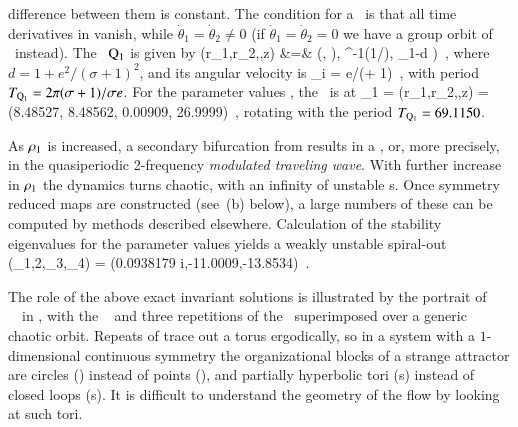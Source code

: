 \documentclass[preprint,number,sort&compress]{elsarticle}
\begin{document}
difference between them is constant.
The condition for a \reqv\ is that all
time derivatives in  vanish, while
$\dot{\theta}_1=\dot{\theta}_2\neq 0$ (if
$\dot{\theta}_1=\dot{\theta}_2=0$ we have a group orbit
of \eqva\ instead).
The \reqv\
$\mathrm{Q}_{1}$ is given by
\bea
(r_1,r_2,\theta,z) &=&
\left(,  ),
     \cos^{-1}({1}/{}),  \rho_1-d
\right)
\,,
\label{eq:E1-PC}
\eea
where $d=1 + {e^2}/{(\sigma +1)^2}$, and
its angular velocity is
\beq
\dot{\theta}_{i}
= {\sigma e}/{(\sigma + 1)}
\,,
\label{eq:REQV1veloc}
\eeq
with period
${T_{{\mathrm{Q}_{1}}}}= 2\pi (\sigma + 1)/\sigma e$.
For the parameter values , the \reqv\ is at
\beq
\ssp_{\REQV{}1} = (r_1,r_2,\theta,z) =
     (8.48527,
      8.48562,
      0.00909,
      26.9999)
\,,
\label{eq:Q1}
\eeq
rotating with the period ${T_{{\mathrm{Q}_{1}}}}=69.1150$.

As $\rho_1$ is increased,  a secondary bifurcation from
 results in a \emph{\rpo} , or,
more precisely, in the quasiperiodic 2-frequency
\emph{modulated traveling wave}. With further
increase in $\rho_1$ the dynamics turns chaotic, with {an}
infinity of unstable {\rpo s}. Once symmetry reduced maps are
constructed (see \,(b) below), a large numbers of
these can be computed by methods described
elsewhere. Calculation of {the}
 stability eigenvalues for the parameter values
yields a weakly unstable spiral-out
\eqv\
\beq
(\eigExp_{1,2},\eigExp_3,\eigExp_4)
= (0.0938179  i,-11.0009,-13.8534)
\,.


The role of {the} above exact in\-vari\-ant solutions is illustrated by the
portrait of \cLf\ \statesp\ in  , with the
\reqv\ \REQV{}{1} and three repetitions of {the} \cycle{01} \rpo\
superimposed over a generic chaotic orbit. Repeats of
\cycle{01} {trace out a torus ergodically}, so in a system with
a $1$-dimensional continuous symmetry the organizational
blocks of a strange attractor are circles (\reqva) instead of
points (\eqva), and partially hyperbolic tori (\rpo s)
instead of closed loops (\po s). It is difficult to
understand the geometry of the flow by looking at such tori.
\end{document}
